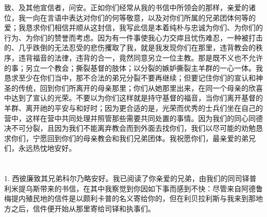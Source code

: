 致、及其他宣信者，问安。正如你们经常从我的书信中所领会的那样，亲爱的诸位，我一向在言语中表达对你们的何等敬意，以及对你们所属的兄弟团体何等的爱；我恳求你们相信并顺从这封信，我写此信是本着纯朴与忠诚为你们、为你们的行为、为你们的赞誉而考虑。因为有一件事使我心力交瘁且忧伤难忍，一种被打击的、几乎跌倒的无法忍受的悲伤攫取了我，就是我发现你们在那里，违背教会的秩序，违背福音的法律，违背的合一，竟然同意另立一位主教。那是既不义也不允许的事；另立一个教会；撕裂基督的肢体；以分裂的嫉妒撕裂主羊群的一心一体。我恳求至少在你们当中，那不合法的弟兄分裂不要再继续；但要记住你们的宣认和神圣的传统，回到你们所离开的母亲那里；你们从她那里出来，在同一个母亲的欣喜中达到了宣认的光荣。不要以为你们这样就是持守基督的福音，当你们离开基督的羊群、离开祂的平安与和好时；因为更合适的是，光荣而优秀的士兵们坐在自己的营中，这样在营中共同处理并照管那些需要共同处置的事情。因为我们的同心同德决不可分裂，且因为我们不能离弃教会而到外面去找你们，我们以尽可能的劝勉恳求你们，宁愿回到你们的母亲教会和我们兄弟团体。我祝愿你们，最亲爱的弟兄们，永远热忱地安好。\par



\section{}

\par

\par

1. 西彼廉致其兄弟科尔乃略安好。我已阅读了你亲爱的兄弟，由我们的同司铎普利米提乌斯带来的书信，在其中我察觉到你因如下事而感到不快：尽管来自阿德鲁梅提内殖民地的信件是以颇利卡普的名义寄给你的，但在利贝拉利斯与我来到那地方之后，信件便开始从那里寄给司铎和执事们。\par

